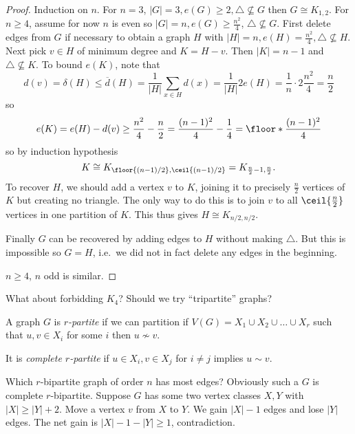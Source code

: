 \documentclass[a4paper]{article}
\begin{document}
\begin{proof}
  Induction on \(n\). For \(n = 3\), \(|G| = 3, e(G) \geq 2, \triangle \nsubseteq G\) then \(G \cong K_{1, 2}\). For \(n \geq 4\), assume for now \(n\) is even so \(|G| = n, e(G) \geq \frac{n^2}{4}\), \(\triangle \nsubseteq G\). First delete edges from \(G\) if necessary to obtain a graph \(H\) with \(|H| = n, e(H) = \frac{n^2}{4}, \triangle \nsubseteq H\). Next pick \(v \in H\) of minimum degree and \(K = H - v\). Then \(|K| = n - 1\) and \(\triangle \nsubseteq K\). To bound \(e(K)\), note that
  \[
    d(v) = \delta(H) \leq \overline d(H) = \frac{1}{|H|} \sum_{x \in H} d(x)
    = \frac{1}{|H|} 2 e(H)
    = \frac{1}{n} \cdot 2 \frac{n^2}{4}
    = \frac{n}{2}
  \]
  so
  \[
    e(K) = e(H) - d(v)
    \geq \frac{n^2}{4} - \frac{n}{2}
    = \frac{(n - 1)^2}{4} - \frac{1}{4}
    = \floor*{\frac{(n - 1)^2}{4}}
  \]
  so by induction hypothesis
  \[
    K \cong K_{\floor{(n - 1)/2}, \ceil{(n - 1)/2}} = K_{\frac{n}{2} - 1, \frac{n}{2}}.
  \]
  To recover \(H\), we should add a vertex \(v\) to \(K\), joining it to precisely \(\frac{n}{2}\) vertices of \(K\) but creating no triangle. The only way to do this is to join \(v\) to all \(\ceil{\frac{n}{2}}\) vertices in one partition of \(K\). This thus gives \(H \cong K_{n/2, n/2}\).

  Finally \(G\) can be recovered by adding edges to \(H\) without making \(\triangle\). But this is impossible so \(G = H\), i.e.\ we did not in fact delete any edges in the beginning.

  \(n \geq 4\), \(n\) odd is similar.
\end{proof}

What about forbidding \(K_4\)? Should we try ``tripartite'' graphs?

\begin{definition}[\(r\)-partite]
  A graph \(G\) is \emph{\(r\)-partite} if we can partition if \(V(G) = X_1 \cup X_2 \cup \dots \cup X_r\) such that \(u,v \in X_i\) for some \(i\) then \(u \nsim v\).

  It is \emph{complete \(r\)-partite} if \(u \in X_i, v \in X_j\) for \(i \neq j\) implies \(u \sim v\).
\end{definition}

Which \(r\)-bipartite graph of order \(n\) has most edges? Obviously such a \(G\) is complete \(r\)-bipartite. Suppose \(G\) has some two vertex classes \(X, Y\) with \(|X| \geq |Y| + 2\). Move a vertex \(v\) from \(X\) to \(Y\). We gain \(|X| - 1\) edges and lose \(|Y|\) edges. The net gain is \(|X| - 1 - |Y| \geq 1\), contradiction.
\end{document}
